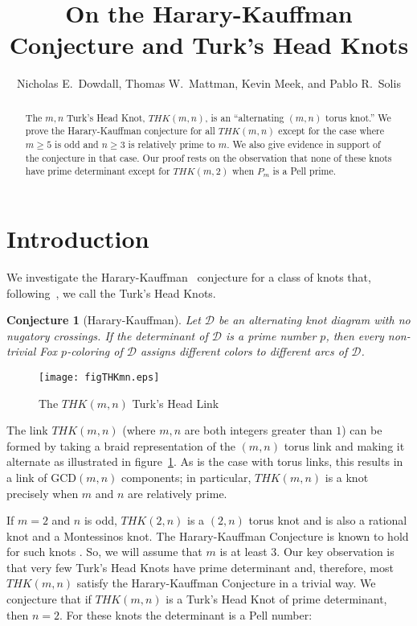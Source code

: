 \documentclass{amsart}
\title{On the Harary-Kauffman Conjecture and Turk's Head Knots}
\author[N.E.\ Dowdall, T.W.\ Mattman, K.\ Meek, and P.R.\ Solis]{Nicholas E.\ Dowdall, Thomas W.\ Mattman, Kevin Meek, and Pablo R.\ Solis}
\newtheorem{conj}[thm]{Conjecture}
\begin{document}
\begin{abstract}
The $m,n$ Turk's Head Knot, $THK(m,n)$, is an ``alternating $(m,n)$ torus knot.'' We prove the Harary-Kauffman conjecture for all $THK(m,n)$ except for the case where $m \geq 5$ is odd and $n \geq 3$ is relatively prime to $m$. We also give evidence in support of the conjecture in that case. 
Our proof rests on the observation that none of 
these knots have prime determinant except for $THK(m,2)$ when $P_m$ is a Pell prime.  
\end{abstract}

\maketitle

\section{Introduction}
We investigate the Harary-Kauffman~\cite{HK} conjecture for a class of knots that, following~\cite{NY}, we call the Turk's Head Knots.

\begin{conj}[Harary-Kauffman] 
Let ${{\mathcal D}}$ be an alternating knot diagram with no nugatory crossings. If the determinant of ${{\mathcal D}}$ is a prime number $p$, then every non-trivial Fox $p$-coloring of ${{\mathcal D}}$ assigns different colors to different arcs of ${{\mathcal D}}$.
\end{conj}

\begin{figure}[ht]
\begin{center}
\texttt{[image: figTHKmn.eps]}
\caption{The $THK(m,n)$ Turk's Head Link}\label{figTHKmn}
\end{center}
\end{figure} 

The link $THK(m,n)$ (where $m,n$ are both integers greater than $1$) can be formed by taking a braid representation of the
$(m,n)$ torus link and making it alternate as illustrated in figure~\ref{figTHKmn}. As is the case with torus links, this results in a link of $\mbox{GCD}(m,n)$ components; in particular, $THK(m,n)$ is a knot precisely when $m$ and $n$ are relatively prime. 

If $m = 2$ and $n$ is odd, $THK(2,n)$ is a $(2,n)$ torus knot and is also a rational knot and a Montessinos knot. 
The Harary-Kauffman Conjecture is known to hold for
such knots \cite{KL,APS}. So, we will assume that $m$ is at least $3$.  
Our key observation is that very few Turk's Head Knots have prime determinant and, therefore, most $THK(m,n)$ satisfy the Harary-Kauffman Conjecture in a trivial way. 
We conjecture that if $THK(m,n)$ is a Turk's Head Knot of prime determinant, then 
$n = 2$. For these knots the determinant is a Pell number:
\end{document}
